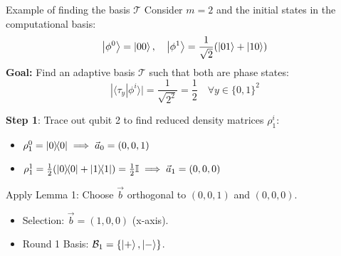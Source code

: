 \begin{frame}{Example of finding the basis $\mathcal{T}$}
    Consider $m=2$ and the initial states in the computational basis:
    \[
        \ket{\phi^0} = \ket{00}, \quad \ket{\phi^1} = \frac{1}{\sqrt{2}} (\ket{01} + \ket{10})
    \]
    \vfill
    \textbf{Goal:} Find an adaptive basis $\mathcal{T}$ such that both are phase states:
    \[
        |\langle \tau_y | \phi^i \rangle| = \frac{1}{\sqrt{2^2}} = \frac{1}{2} \quad \forall y \in \{0,1\}^2
    \]

    \textbf{Step 1}: Trace out qubit 2 to find reduced density matrices $\rho^i_1$:
    \begin{itemize}
        \item $\rho^0_1 = \ketbra{0}{0} \implies \vec{a}_0 = (0, 0, 1)$
        \item $\rho^1_1 = \frac{1}{2}(\ketbra{0}{0} + \ketbra{1}{1}) = \frac{1}{2}\mathbb{I} \implies \vec{a}_1 = (0, 0, 0)$
    \end{itemize}
    Apply Lemma 1: Choose $\vec{b}$ orthogonal to $(0,0,1)$ and $(0,0,0)$.
    \begin{itemize}
        \item Selection: $\vec{b} = (1, 0, 0)$ (x-axis).
        \item Round 1 Basis: $\mathcal{B}_1 = \{\ket{+}, \ket{-}\}$.
    \end{itemize}
\end{frame}

